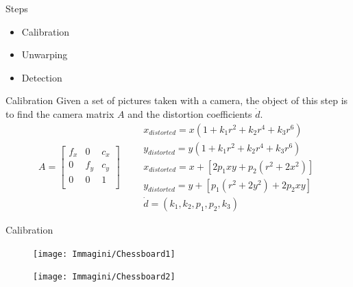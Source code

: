 \begin{frame}[t,plain]
\titlepage
\end{frame}

\begin{frame}{Steps}
	\begin{itemize}
		\item Calibration
		\item Unwarping
		\item Detection
	\end{itemize}
\end{frame}


\begin{frame}{Calibration}
	Given a set of pictures taken with a camera, the object of this step is to find the camera matrix $A$ and the distortion coefficients $\dot{d}$.\newline
	\vfill
	\[
		A=\begin{bmatrix}
			f_x&0&c_x\\
			0&f_y&c_y\\
			0&0&1\\
		\end{bmatrix}\qquad
		\begin{matrix}
			x_{distorted}=x\left(1+k_1r^2+k_2r^4+k_3r^6\right)\\
			y_{distorted}=y\left(1+k_1r^2+k_2r^4+k_3r^6\right)\\
			x_{distorted}=x+\left[2p_1xy+p_2\left(r^2+2x^2\right)\right]\\
			y_{distorted}=y+\left[p_1\left(r^2+2y^2\right)+2p_2xy\right]\\
			\dot{d}=(k_1, k_2, p_1, p_2, k_3)
		\end{matrix}
	\]
	\vfill
\end{frame}


\begin{frame}{Calibration}
	\begin{figure}[H]
		\begin{minipage}{0.48\linewidth}
			\texttt{[image: Immagini/Chessboard1]}
		\end{minipage}
		\vspace{0.04\linewidth}
		\begin{minipage}{0.48\linewidth}
			\texttt{[image: Immagini/Chessboard2]}
		\end{minipage}
	\end{figure}
\end{frame}


